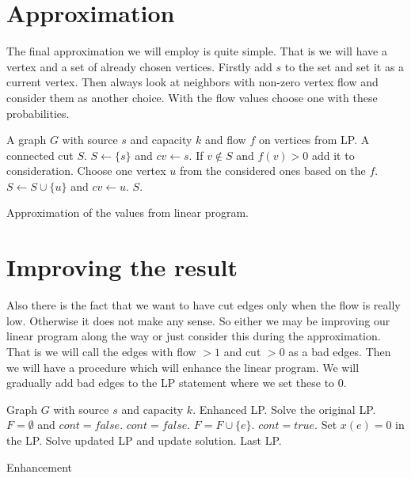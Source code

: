 \documentclass{article}
\theoremstyle{plain}
\theoremstyle{plain}
\theoremstyle{remark}
\begin{document}
	\section{Approximation}
	
	The final approximation we will employ is quite simple. That is we will have a vertex and a set of already chosen vertices. Firstly add $s$ to the set and set it as a current vertex. Then always look at neighbors with non-zero vertex flow and consider them as another choice. With the flow values choose one with these probabilities.
	
	\begin{algorithm}[!ht]
		\begin{algorithmic}[1]
			\Require A graph $G$ with source $s$ and capacity $k$ and flow $f$ on vertices from LP.
			\Ensure A connected cut $S$.
			\State $S \leftarrow \{s\}$ and $cv \leftarrow s$.
					\State If $v \notin S$ and $f(v) > 0$ add it to consideration.
				\EndFor
				\State Choose one vertex $u$ from the considered ones based on the $f$.
				\State $S \leftarrow S \cup \{u\}$ and $cv \leftarrow u$.
			\EndWhile
			\State \Return $S$.
		\end{algorithmic}
		\caption{Approximation of the values from linear program.}
	\end{algorithm}

	\section{Improving the result}
	
	Also there is the fact that we want to have cut edges only when the flow is really low. Otherwise it does not make any sense. So either we may be improving our linear program along the way or just consider this during the approximation. That is we will call the edges with flow $> 1$ and cut $> 0$ as a bad edges. Then we will have a procedure which will enhance the linear program. We will gradually add bad edges to the LP statement where we set these to $0$.
	
	\begin{algorithm}[!ht]
		\begin{algorithmic}[1]
			\Require Graph $G$ with source $s$ and capacity $k$.
			\Ensure Enhanced LP.
			\State Solve the original LP.
			\State $F = \emptyset$ and $cont = false$.
				\State $cont = false$.
						\State $F = F \cup \{e\}$.
						\State $cont = true$.
					\EndIf
				\EndFor
				\ForAll{$e$ in $F$}
					\State Set $x(e) = 0$ in the LP.
				\EndFor
				\State Solve updated LP and update solution.
			\EndWhile
			\State \Return Last LP.
		\end{algorithmic}
		\caption{Enhancement}
	\end{algorithm}
	
\end{document}
